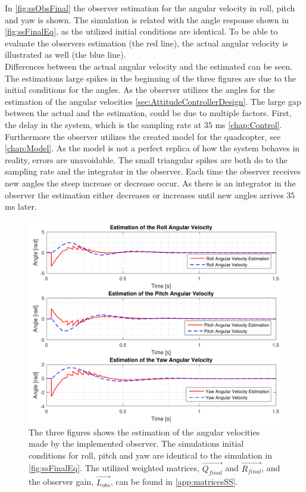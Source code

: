 In \autoref{fig:ssObsFinal} the observer estimation for the angular velocity in roll, pitch and yaw is shown. The simulation is related with the angle response shown in \autoref{fig:ssFinalEq}, as the utilized initial conditions are identical. To be able to evaluate the observers estimation (the red line), the actual angular velocity is illustrated as well (the blue line). \\ Differences between the actual angular velocity and the estimated can be seen. The estimations large spikes in the beginning of the three figures are due to the initial conditions for the angles. As the observer utilizes the angles for the estimation of the angular velocities \autoref{sec:AttitudeControllerDesign}. The large gap between the actual and the estimation, could be due to multiple factors. First, the delay in the system, which is the sampling rate at $35$ \si{ms} \autoref{chap:Control}. Furthermore the observer utilizes the created model for the quadcopter, see \autoref{chap:Model}. As the model is not a perfect replica of how the system behaves in reality, errors are unavoidable. The small triangular spikes are both do to the sampling rate and the integrator in the observer. Each time the observer receives new angles the steep increase or decrease occur. As there is an integrator in the observer the estimation either decreases or increases until new angles arrives $35$ \si{ms} later.

\begin{figure}[H]
	\centering
	\includegraphics[scale=0.7]{figures/ssObsFinal.pdf}
	\caption{The three figures shows the estimation of the angular velocities made by the implemented observer. The simulations initial conditions for roll, pitch and yaw are identical to the simulation in \autoref{fig:ssFinalEq}. The utilized weighted matrices, $\vec{Q_{final}}$ and $\vec{R_{final}}$, and the observer gain, $\vec{L_{obs}}$, can be found in \autoref{app:matricesSS}.}
	\label{fig:ssObsFinal}
\end{figure}

